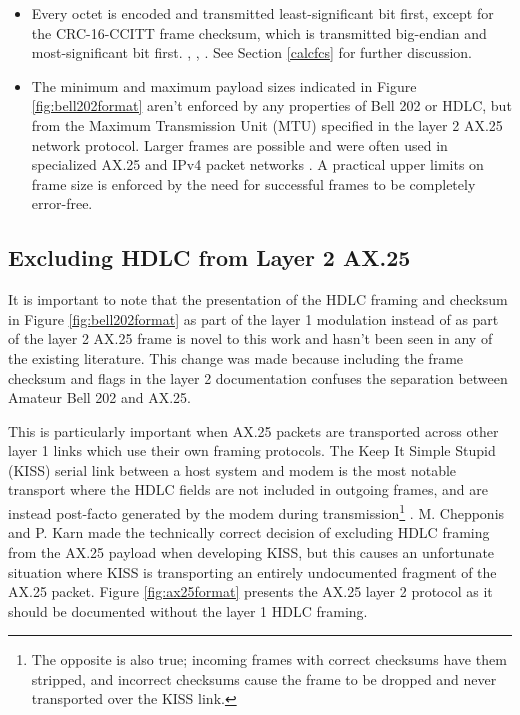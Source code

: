 \documentclass[12pt,letterpaper]{article}
\begin{document}
\begin{itemize}
{			Seven or more ones in a row indicate an invalid channel state
			that shouldn't happen, but regularly does, so modems must be 
			able to handle arbitrary strings of ones gracefully.}
	\item Every octet is encoded and transmitted least-significant bit first,
		except for the CRC-16-CCITT frame checksum, 
		which is transmitted big-endian
		and most-significant bit first.
		\cite[\S3.8]{ax25spec},
		\cite[\S8.1.1-2]{ituv42},
		\cite{n1vgphy}.
		See Section \ref{calcfcs} for further discussion.
	\item The minimum and maximum payload sizes indicated in Figure 
		\ref{fig:bell202format} aren't enforced by any properties of 
		Bell 202 or HDLC, but from the Maximum Transmission Unit (MTU)
		specified in the layer 2 AX.25 network protocol.
		Larger frames are possible and were often used in specialized 
		AX.25 and IPv4 packet networks \cite{pattersoninterview}.
		A practical upper limits on frame size is enforced by
		the need for successful frames to be completely error-free.


\end{itemize}

\subsection{Excluding HDLC from Layer 2 AX.25}

It is important to note that the presentation of the HDLC framing
and checksum
in Figure \ref{fig:bell202format} as part of the layer 1 modulation 
instead of as part of the layer 2 AX.25 frame is 
novel to this work and hasn't been seen in any of the existing literature.
This change was made because including the frame checksum and flags
in the layer 2 documentation confuses the separation between Amateur Bell 202 
and AX.25. 

This is particularly important when AX.25 packets are transported across 
other layer 1 links which use their own framing protocols.
The Keep It Simple Stupid (KISS) serial link between 
a host system and modem is the most notable
transport where the HDLC fields are not included in outgoing frames, 
and are instead 
post-facto generated by the modem during transmission\footnote{The opposite
	is also true; incoming frames with correct checksums have them stripped,
	and incorrect checksums cause the frame to be dropped and never
transported over the KISS link.} \cite{KISSspec}.
M. Chepponis and P. Karn made the technically correct decision of excluding 
HDLC framing from the AX.25 payload when developing KISS, but this causes
an unfortunate situation where KISS is transporting an entirely
undocumented fragment of the AX.25 packet. Figure \ref{fig:ax25format} 
presents the AX.25 layer 2 protocol as it should be documented without
the layer 1 HDLC framing.
\end{document}
